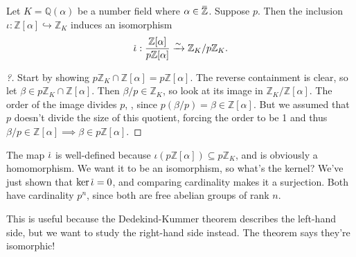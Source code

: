 \begin{lemma}[?]

Let \(K = {\mathbb{Q}}( \alpha)\) be a number field where
\(\alpha \in \mkern 1.5mu\overline{\mkern-1.5mu{\mathbb{Z}}\mkern-1.5mu}\mkern 1.5mu\).
Suppose
\(p%
\). Then the inclusion
\(\iota: {\mathbb{Z}}[\alpha] \hookrightarrow{\mathbb{Z}}_K\) induces an
isomorphism
\begin{align*}
\mkern 1.5mu\overline{\mkern-1.5mu\iota\mkern-1.5mu}\mkern 1.5mu: {{\mathbb{Z}}[\alpha] \over p {\mathbb{Z}}[ \alpha] } \xrightarrow{\sim} {\mathbb{Z}}_K/p{\mathbb{Z}}_K
.\end{align*}

\end{lemma}

\begin{proof}[?]

Start by showing
\(p {\mathbb{Z}}_K \cap{\mathbb{Z}}[ \alpha] = p {\mathbb{Z}}[ \alpha ]\).
The reverse containment is clear, so let
\(\beta\in p {\mathbb{Z}}_K \cap{\mathbb{Z}}[ \alpha ]\). Then
\(\beta/p \in {\mathbb{Z}}_K\), so look at its image in
\({\mathbb{Z}}_K/ {\mathbb{Z}}[ \alpha]\). The order of the image
divides \(p\), , since
\(p (\beta/p) = \beta \in {\mathbb{Z}}[ \alpha]\). But we assumed that
\(p\) doesn't divide the size of this quotient, forcing the order to be
1 and thus
\(\beta/p\in {\mathbb{Z}}[ \alpha] \implies \beta \in p{\mathbb{Z}}[ \alpha]\).

\end{proof}

\begin{remark}

The map
\(\mkern 1.5mu\overline{\mkern-1.5mu\iota\mkern-1.5mu}\mkern 1.5mu\) is
well-defined because
\(\iota( p {\mathbb{Z}}[ \alpha]) \subseteq p{\mathbb{Z}}_K\), and is
obviously a homomorphism. We want it to be an isomorphism, so what's the
kernel? We've just shown that
\(\ker \mkern 1.5mu\overline{\mkern-1.5mu\iota \mkern-1.5mu}\mkern 1.5mu= 0\),
and comparing cardinality makes it a surjection. Both have cardinality
\(p^n\), since both are free abelian groups of rank \(n\).

\end{remark}

\begin{remark}

This is useful because the Dedekind-Kummer theorem describes the
left-hand side, but we want to study the right-hand side instead. The
theorem says they're isomorphic!

\end{remark}

